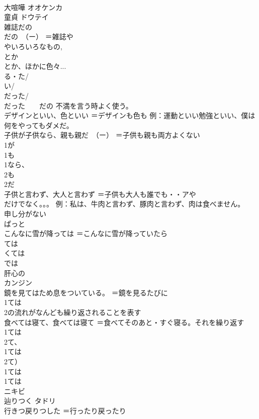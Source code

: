 \documentclass[8pt]{extreport}
\begin{document}
\begin{CJK}{UTF8}{min}
\\	大喧嘩	オオケンカ
\\	童貞	ドウテイ 
\\	雑誌だの
\\	だの　（ー）	＝雑誌や
\\	やいろいろなもの, 
\\	とか
\\	とか、ほかに色々... 
\\	る・た/
\\	い/
\\	だった/
\\	だった　　だの 不満を言う時よく使う。
\\	デザインといい、色といい	＝デザインも色も 例：運動といい勉強といい、僕は何をやってもダメだ。
\\	子供が子供なら、親も親だ　（ー）	＝子供も親も両方よくない 
\\	1が 
\\	1も　　
\\	1なら、
\\	2も
\\	2だ
\\	子供と言わず、大人と言わず	＝子供も大人も誰でも・・アや
\\	だけでなく。。。 例：私は、牛肉と言わず、豚肉と言わず、肉は食べません。
\\	申し分がない	
\\	ぱっと	
\\	こんなに雪が降っては	＝こんなに雪が降っていたら 
\\	ては 
\\	くては 
\\	では
\\	肝心の
\\	カンジン
\\	鏡を見てはため息をついている。	＝鏡を見るたびに 
\\	1ては
\\	2の流れがなんども繰り返されることを表す
\\	食べては寝て、食べては寝て	＝食べてそのあと・すぐ寝る。それを繰り返す 
\\	1ては
\\	2て、
\\	1ては
\\	2て） 
\\	1ては
\\	1ては
\\	ニキビ	
\\	辿りつく	タドリ 
\\	行きつ戻りつした	＝行ったり戻ったり 

\end{CJK}
\end{document}
